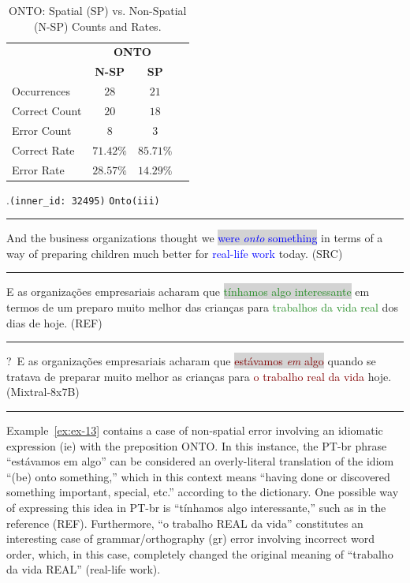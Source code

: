 \begin{table}[htb]
\centering
\begin{tabular}{@{}lccc@{}} \\
\toprule
& \multicolumn{2}{c}{\textbf{ONTO}} \\ 
& \textbf{N-SP} & \textbf{SP} \\
\midrule
Occurrences & $28$ & $21$ \\
Correct Count & $20$ & $18$ \\
Error Count & $8$ & $3$ \\
\midrule
Correct Rate & $71.42\%$ & $\mathbf{85.71\%}$ \\
\midrule
Error Rate & $\mathbf{28.57\%}$ & $14.29\%$ \\
\bottomrule
\end{tabular}
\caption{ONTO: Spatial (SP) vs. Non-Spatial (N-SP) Counts and Rates.} \label{tab:onto} 
\end{table}


\ex.\texttt{(inner\_id: 32495)} \hfill \texttt{Onto(iii)} \\[0.3ex]
\noindent\rule{\linewidth}{0.9pt}
And the business organizations thought we \colorbox{lightgray}{\textcolor{blue}{were \emph{onto} something}} in terms of a way of preparing children much better for \textcolor{blue}{real-life work} today. (SRC) \label{ex:ex-13} \\[-0.3ex]
\noindent\rule{\linewidth}{0.3pt}
E as organizações empresariais acharam que \colorbox{lightgray}{\textcolor{ForestGreen}{tínhamos algo interessante}} em termos de um preparo muito melhor das crianças para \textcolor{ForestGreen}{trabalhos da vida real} dos dias de hoje. (REF) \\[-0.3ex]
\noindent\rule{\linewidth}{0.3pt}
?~E as organizações empresariais acharam que \colorbox{lightgray}{\textcolor{Maroon}{estávamos \emph{em} algo}} quando se tratava de preparar muito melhor as crianças para \textcolor{Maroon}{o trabalho real da vida} hoje. (Mixtral-8x7B) \\[-0.3ex]
\noindent\rule{\linewidth}{0.9pt}

Example~\ref{ex:ex-13} contains a case of non-spatial error involving an idiomatic expression (ie) with the preposition ONTO.  In this instance, the PT-br phrase ``estávamos em algo'' can be considered an overly-literal translation of the idiom ``(be) onto something,'' which in this context means ``having done or discovered something important, special, etc.'' according to the \textcite{merriamwebster_onto_something} dictionary. One possible way of expressing this idea in PT-br is ``tínhamos algo interessante,'' such as in the reference (REF). Furthermore, ``o trabalho REAL da vida'' constitutes an interesting case of grammar/orthography (gr) error involving incorrect word order, which, in this case, completely changed the original meaning of ``trabalho da vida REAL'' (real-life work).


